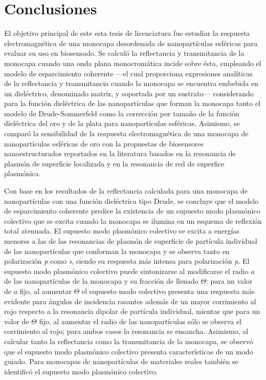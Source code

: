 \chapter*{Conclusiones}
\label{chapter:Conclusiones}

El objetivo principal de este esta tesis de licenciatura fue estudiar la respuesta electromagnética de una monocapa desordenada de nanopartículas esféricas para evaluar su uso en biosensado. Se calculó la  reflectancia y transmitancia de la monocapa cuando una onda plana monocromática incide sobre ésta, empleando el modelo de esparcimiento coherente \cite{reyes2018analytical,pena-gomar2006coherent,barrera1991optical,garcia2012multiple} ---el cual proporciona expresiones analíticas de la reflectancia y transmitancia cuando la monocapa se encuentra embebida en un dieléctrico, denominado matriz, y soportada por un sustrato--- considerando para  la función dieléctrica de las nanopartículas que forman la monocapa tanto el modelo de Drude-Sommerfeld como  la corrección por tamaño de la función dieléctrica del oro y de la plata para nanopartículas esféricas. Asimismo, se comparó la sensibilidad de la respuesta electromagnética de una monocapa de nanopartículas esféricas de oro con la  propuestas de biosensores nanoestructurados reportados en la literatura \cite{svedendahl2009refractometric,kabashin2009plasmonic,danilov2018ultra} basados en la resonancia de plasmón de superficie localizada y en la resonancia de red de superfice plasmónica. %

Con base en los resultados de la reflectancia calculada para una monocapa de nanopartículas con una función dieléctrica tipo Drude, se concluye que el  modelo de esparcimiento coherente predice la existencia de un supuesto modo plasmónico colectivo que se excita cuando la monocapa se ilumina en un esquema de reflexión total atenuada. El supuesto modo plasmónico colectivo se excita a energías menores a las de las resonancias de plasmón de superficie de partícula individual de las nanopartículas que conforman la monocapa y se observa tanto en polarización \emph{p} como \emph{s}, siendo su respuesta más intensa para polarización \emph{p}. El supuesto modo plasmónico colectivo puede sintonizarse al modificarse el radio $a$ de las nanopartículas de la monocapa y su fracción de llenado $\Theta$: para un valor de $a$ fijo, al aumentar $\Theta$ el supuesto modo colectivo presenta una respuesta más evidente para ángulos de incidencia rasantes además de un mayor corrimiento al rojo respecto a la resonancia dipolar de partícula individual, mientas que para un valor de $\Theta$ fijo, al aumentar el radio de las nanopartículas sólo se observa el corrimiento al rojo; para ambos casos la resonancia se ensancha. Asimismo, al calcular tanto la reflectancia como la transmitancia de la monocapa, se observó que el supuesto modo plasmónico colectivo presenta características de un modo guiado. Para monocapas de nanopartículas de materiales reales también se identificó el supuesto modo plasmónico colectivo.

